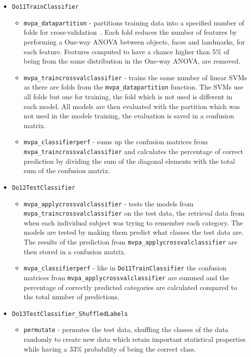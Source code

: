 \documentclass[12pt, a4paper]{article}
\begin{document}
\begin{itemize}
    \item \texttt{Do11TrainClassifier}
    \begin{itemize}
        \item \texttt{mvpa\_datapartition} - partitions training data into a specified number of folds for cross-validation~\cite{enwiki:crossvalidation}.
        Each fold reduces the number of features by performing a One-way ANOVA between objects, faces and landmarks, for each feature.
        Features computed to have a chance higher than 5\% of being from the same distribution in the One-way ANOVA, are removed.
        
        \item \texttt{mvpa\_traincrossvalclassifier} - trains the same number of linear SVMs as there are folds from the \texttt{mvpa\_datapartition} function.
        The SVMs use all folds but one for training, the fold which is not used is different in each model.
        All models are then evaluated with the partition which was not used in the models training, the evaluation is saved in a confusion matrix.
        
        \item \texttt{mvpa\_classifierperf} - sums up the confusion matrices from \texttt{mvpa\_traincrossvalclassifier} and calculates the percentage of correct prediction by dividing the sum of the diagonal elements with the total sum of the confusion matrix.
    \end{itemize}
    \item \texttt{Do12TestClassifier}
    \begin{itemize}
        
        \item \texttt{mvpa\_applycrossvalclassifier} - tests the models from \\
        \texttt{mvpa\_traincrossvalclassifier} on the test data, the retrieval data from when each individual subject was trying to remember each category.
        The models are tested by making them predict what classes the test data are.
        The results of the prediction from \texttt{mvpa\_applycrossvalclassifier} are then stored in a confusion matrix.
        
        \item \texttt{mvpa\_classifierperf} - like in \texttt{Do11TrainClassifier} the confusion matrices from \texttt{mvpa\_applycrossvalclassifier} are summed and the percentage of correctly predicted categories are calculated compared to the total number of predictions.
    \end{itemize}
    \item \texttt{Do13TestClassifier\_ShuffledLabels}
    \begin{itemize}
        \item \texttt{permutate} - permutes the test data, shuffling the classes of the data randomly to create new data which retain important statistical properties while having a 33\% probability of being the correct class.
        

\end{itemize}
\end{itemize}
\end{document}
